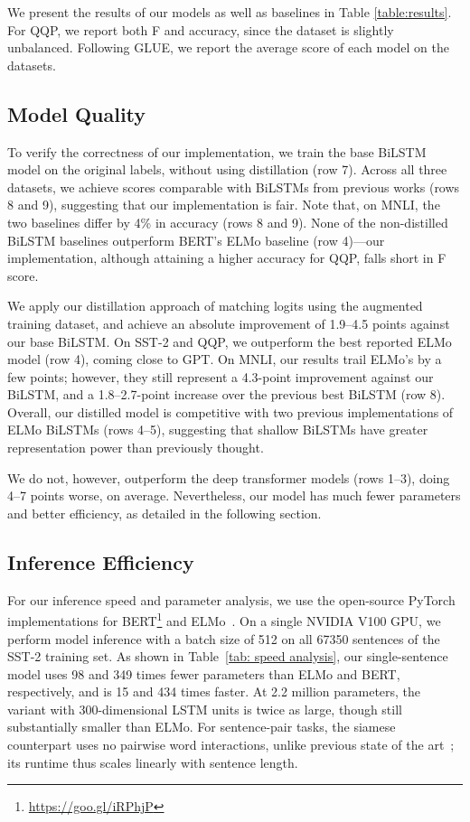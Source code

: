 \documentclass[11pt,a4paper]{article}
\begin{document}
We present the results of our models as well as baselines in Table \ref{table:results}.
For QQP, we report both F and accuracy, since the dataset is slightly unbalanced.
Following GLUE, we report the average score of each model on the datasets.


\subsection{Model Quality}

To verify the correctness of our implementation, we train the base BiLSTM model on the original labels, without using distillation (row 7).
Across all three datasets, we achieve scores comparable with BiLSTMs from previous works (rows 8 and 9), suggesting that our implementation is fair.
Note that, on MNLI, the two baselines differ by 4\% in accuracy (rows 8 and 9).
None of the non-distilled BiLSTM baselines outperform BERT's ELMo baseline (row 4)---our implementation, although attaining a higher accuracy for QQP, falls short in F score.


We apply our distillation approach of matching logits using the augmented training dataset, and achieve an absolute improvement of 1.9--4.5 points against our base BiLSTM.
On SST-2 and QQP, we outperform the best reported ELMo model (row 4), coming close to GPT.
On MNLI, our results trail ELMo's by a few points; however, they still represent a 4.3-point improvement against our BiLSTM, and a 1.8--2.7-point increase over the previous best BiLSTM (row 8). Overall, our distilled model is competitive with two previous implementations of ELMo BiLSTMs (rows 4--5), suggesting that shallow BiLSTMs have greater representation power than previously thought.

We do not, however, outperform the deep transformer models (rows 1--3), doing 4--7 points worse, on average.
Nevertheless, our model has much fewer parameters and better efficiency, as detailed in the following section.










\subsection{Inference Efficiency}

For our inference speed and parameter analysis, we use the open-source PyTorch implementations for BERT\footnote{\url{https://goo.gl/iRPhjP}} and ELMo~\cite{Gardner2017AllenNLP}.
On a single NVIDIA V100 GPU, we perform model inference with a batch size of 512 on all 67350 sentences of the SST-2 training set.
As shown in Table~\ref{tab: speed analysis}, our single-sentence model uses 98 and 349 times fewer parameters than ELMo and BERT, respectively, and is 15 and 434 times faster.
At 2.2 million parameters, the variant with 300-dimensional LSTM units is twice as large, though still substantially smaller than ELMo.
For sentence-pair tasks, the siamese counterpart uses no pairwise word interactions, unlike previous state of the art~\cite{he2016pairwise}; its runtime thus scales linearly with sentence length.
\end{document}
